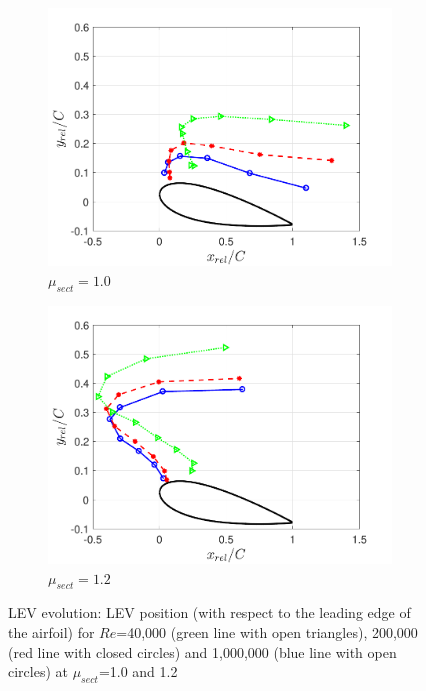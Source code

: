 
\begin{figure}[H]
	\begin{subfigure}{0.5\textwidth}
		\includegraphics[width=1\textwidth]{figures/LEV_location_lambda_1pt0}
		\caption{$\mu_{sect} = 1.0$}
		\label{fig:LEV_location_lambda_1p0}
	\end{subfigure}
	\begin{subfigure}{0.5\textwidth}
		\includegraphics[width=1\textwidth]{figures/LEV_location_lambda_1pt2}
		\caption{$\mu_{sect} = 1.2$}
		\label{fig:LEV_location_lambda_1p2}
	\end{subfigure}
 	\caption{LEV evolution: LEV position (with respect to the leading edge of the airfoil) for $Re$=40,000 (green line with open triangles), 200,000 (red line with closed circles) and 1,000,000 (blue line with open circles) at $\mu_{sect}$=1.0 and 1.2}
	\label{fig:LEV_location_LE_airfoil}
\end{figure}

